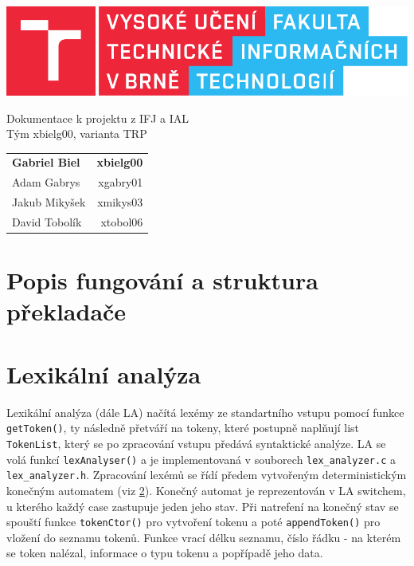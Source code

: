 \documentclass[a4paper, 12pt]{article}
\begin{document}
    \begin{titlepage}
		\centering

        \includegraphics{src/fitlogo.pdf}


        {\Huge Dokumentace k projektu z IFJ a IAL\\[0.4em]
            \LARGE Tým xbielg00, varianta TRP}


        \begin{table}[H]
            \hfill
            \begin{tabularx}{0.5\textwidth}{Xr}
                \textbf{Gabriel Biel} & \textbf{xbielg00} \\
                Adam Gabrys & xgabry01 \\
                Jakub Mikyšek & xmikys03 \\
                David Tobolík & xtobol06 \\
            \end{tabularx}
        \end{table}
	\end{titlepage}

    \tableofcontents
    \newpage

    \section{Popis fungování a struktura překladače}

    \section{Lexikální analýza}
    Lexikální analýza (dále LA) načítá lexémy ze standartního vstupu pomocí funkce \texttt{getToken()}, ty následně přetváří na tokeny, které postupně naplňují list \texttt{TokenList}, který se po zpracování vstupu předává syntaktické analýze. LA se volá funkcí \texttt{lexAnalyser()} a je implementovaná v souborech \texttt{lex\_analyzer.c} a \texttt{lex\_analyzer.h}. Zpracování lexémů se řídí předem vytvořeným deterministickým konečným automatem (viz \ref{}). Konečný automat je reprezentován v LA  switchem, u kterého každý case zastupuje jeden jeho stav. Při natrefení na konečný stav se spouští funkce \texttt{tokenCtor()} pro vytvoření tokenu a poté \texttt{appendToken()} pro vložení do seznamu tokenů. Funkce vrací délku seznamu, číslo řádku - na kterém se token nalézal, informace o typu tokenu a popřípadě jeho data.
    
\end{document}
